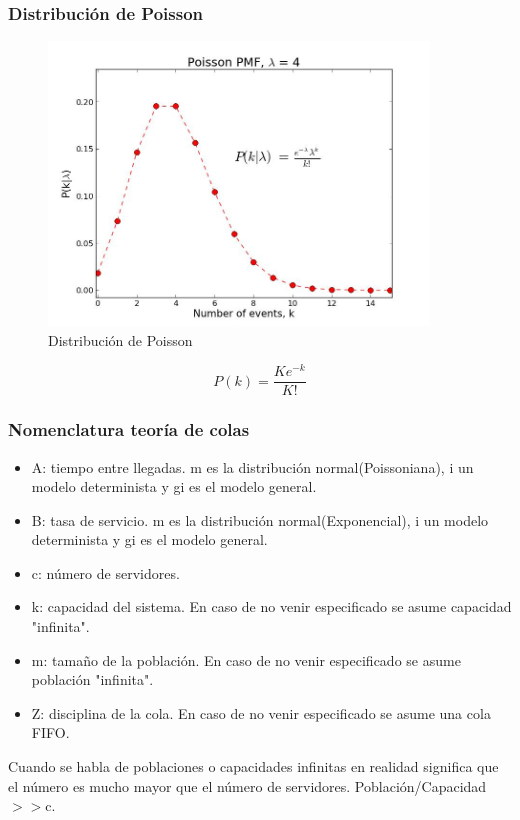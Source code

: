\subsubsection{Distribución de Poisson}
\begin{figure}[H]
\centering
\includegraphics[width=0.9\textwidth]{Imagen/distribucionpoisson.jpg}
\caption{Distribución de Poisson}
\label{}
\end{figure}
\begin{equation}
P(k)=\frac{Ke^{-k}}{K!}
\end{equation}
\subsubsection{Nomenclatura teoría de colas}
\begin{center}
 \par
\end{center}
\begin{itemize}
\item {A:} tiempo entre llegadas. m es la distribución normal(Poissoniana), i un modelo determinista y gi es el modelo general.
\item {B:} tasa de servicio. m es la distribución normal(Exponencial), i un modelo determinista y gi es el modelo general.
\item {c:} número de servidores.
\item {k:} capacidad del sistema. En caso de no venir especificado se asume capacidad "infinita".
\item {m:} tamaño de la población. En caso de no venir especificado se asume población "infinita".
\item {Z:} disciplina de la cola. En caso de no venir especificado se asume una cola \acrshort{FIFO}.
\end{itemize}
Cuando se habla de poblaciones o capacidades infinitas en realidad significa que el número es mucho mayor que el número de servidores. Población/Capacidad$>>$c.
